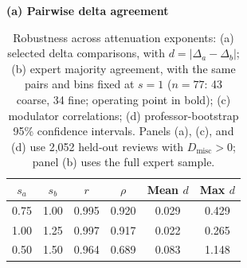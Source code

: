 \documentclass[fleqn,10pt]{JLA_article}
\begin{document}
\begin{table}[htbp]
\centering
\caption{Robustness across attenuation exponents: (a) selected delta comparisons, with $d=|\Delta_a-\Delta_b|$; (b) expert majority agreement, with the same pairs and bins fixed at $s=1$ ($n=77$: 43 coarse, 34 fine; operating point in bold); (c) modulator correlations; (d) professor-bootstrap 95\% confidence intervals. Panels (a), (c), and (d) use 2{,}052 held-out reviews with $D_{\text{misc}}>0$; panel (b) uses the full expert sample.}
\label{tab:sensitivity}
\begin{minipage}[t]{0.56\linewidth}
    \centering
    \small
    \textbf{(a) Pairwise delta agreement}\\[0.2em]
    \setlength{\tabcolsep}{3pt}
    \begin{tabular*}{\linewidth}{@{\extracolsep{\fill}}cccccc@{}}
    \toprule
    $s_a$ & $s_b$ & $r$ & $\rho$ & Mean $d$ & Max $d$ \\
    \midrule
    0.75 & 1.00 & 0.995 & 0.920 & 0.029 & 0.429 \\
    1.00 & 1.25 & 0.997 & 0.917 & 0.022 & 0.265 \\
    0.50 & 1.50 & 0.964 & 0.689 & 0.083 & 1.148 \\
    \bottomrule
    \end{tabular*}
    \vspace{0.5em}


\end{minipage}
\end{table}
\end{document}
